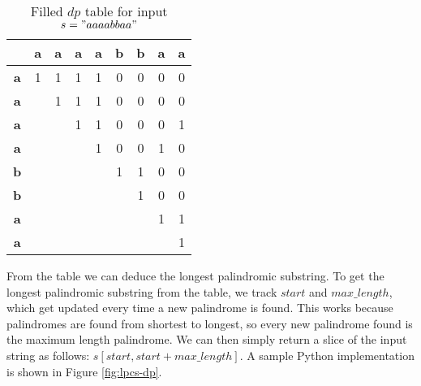 \begin{table}[htbp]
    \centering
    \begin{tabular}{|c|c|c|c|c|c|c|c|c|}
        \hline
          & \textbf{a} & \textbf{a} & \textbf{a} & \textbf{a} & \textbf{b} & \textbf{b} & \textbf{a} & \textbf{a} \\
        \hline
        \textbf{a} & 1 & 1 & 1 & 1 & 0 & 0 & 0 & 0 \\
        \hline
        \textbf{a} &  & 1 & 1 & 1 & 0 & 0 & 0 & 0 \\
        \hline
        \textbf{a} &  &  & 1 & 1 & 0 & 0 & 0 & 1 \\
        \hline
        \textbf{a} &  &  &  & 1 & 0 & 0 & 1 & 0 \\
        \hline
        \textbf{b} &  &  &  &  & 1 & 1 & 0 & 0 \\
        \hline
        \textbf{b} &  &  &  &  &  & 1 & 0 & 0 \\
        \hline
        \textbf{a} &  &  &  &  &  &  & 1 & 1 \\
        \hline
        \textbf{a} &  &  &  &  &  &  &  & 1 \\
        \hline
    \end{tabular}
    \caption{Filled $dp$ table for input $s="aaaabbaa"$}
\end{table}


From the table we can deduce the longest palindromic substring.
To get the longest palindromic substring from the table, we track $start$ and $max\_length$, which get updated every time a new palindrome is found.
This works because palindromes are found from shortest to longest, so every new palindrome found is the maximum length palindrome.
We can then simply return a slice of the input string as follows: $s[start,start+max\_length]$.
A sample Python implementation is shown in Figure \ref{fig:lpcs-dp}.

